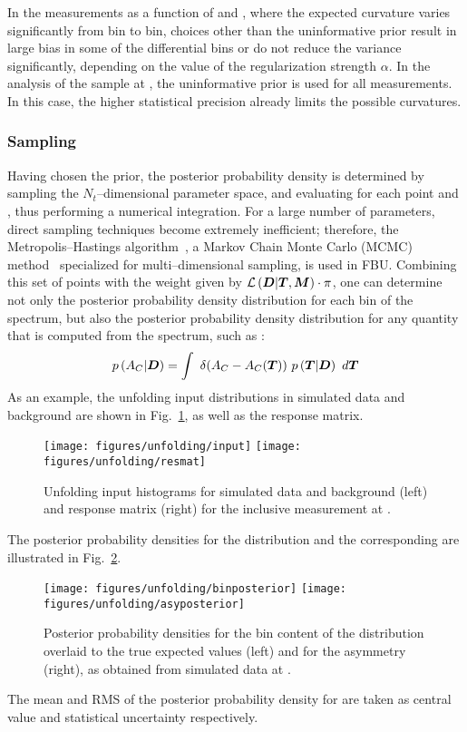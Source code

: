 In the measurements as a function of \mtt{} and \ytt{}, where the
expected curvature varies significantly from bin to bin, choices
other than the uninformative prior result in large bias in some of
the differential bins or do not reduce the variance significantly,
depending on the value of the regularization strength $\alpha{}$.
In the analysis of the sample at \eighttev{}, the uninformative
prior is used for all measurements. In this case, the higher
statistical precision already limits the possible curvatures.

\subsubsection{Sampling}
\label{sec:sampling}
Having chosen the prior, the posterior probability density
\conditionalProb{\Truth{}}{\Data{}} is determined by sampling the
$N_t$--dimensional parameter space, and evaluating for each point
\conditionalLhood{\Data{}}{\Truth{}} and \prior{}, thus performing a
numerical integration. For a large number of parameters, direct
sampling techniques become extremely inefficient; therefore, the
Metropolis--Hastings algorithm~\cite{metropolis}, a Markov
Chain Monte Carlo (MCMC) method~\cite{MR2476411} specialized for
multi--dimensional sampling, is used in FBU.
Combining this set of points with the weight given by
$\mathcal{L}\left(\boldsymbol{D}{}|\boldsymbol{T}{},\boldsymbol{M}{}\right)\cdot{}\pi{}$, one
can determine not only the posterior probability density distribution
for each bin of the spectrum, but also the posterior probability
density distribution for any quantity that is computed from the
spectrum, such as \ac{}:
\begin{equation}
p\left(A_C{}|\boldsymbol{D}{}\right) = 
\int~
\delta(A_C{}-A_C{}(\boldsymbol{T}{}))~
p\left(\boldsymbol{T}{}|\boldsymbol{D}{}\right)~d\boldsymbol{T}{}
\end{equation}
As an example, the unfolding input \dy{} distributions in simulated data and
background are shown in Fig.~\ref{fig:unfinput}, as well as the
response matrix.
%
\begin{figure}[!htb]\centering
  \texttt{[image: figures/unfolding/input]}
  \texttt{[image: figures/unfolding/resmat]}
  \caption{
    \label{fig:unfinput}
   Unfolding input histograms for simulated data and background (left) and
   response matrix (right) for the inclusive \ac{} measurement at \seventev{}.
   }
\end{figure}
%
The posterior probability densities for the \dy{} distribution and the corresponding
\ac{} are illustrated in Fig.~\ref{fig:posteriorIncl}.
%
\begin{figure}[!htb]\centering
  \texttt{[image: figures/unfolding/binposterior]}
  \texttt{[image: figures/unfolding/asyposterior]}
  \caption{
    \label{fig:posteriorIncl}
   Posterior probability densities for the bin content of the \dy{}
   distribution overlaid to the true expected values (left) and for
   the asymmetry \ac{} (right), as obtained from simulated data at
   \eighttev{}.
   }
\end{figure}
%
The mean and RMS of the posterior probability density for \ac{} are
taken as central value and statistical uncertainty respectively. 

